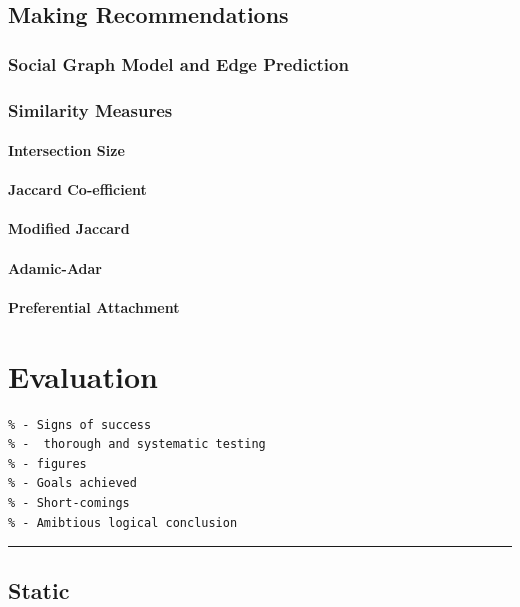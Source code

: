 \documentclass[a4paper,12pt,twoside,notitlepage]{report}
\newcommand{\rulewidth}{300pt}
\newcommand{\halfrule}{
  \begin{center}
    {\rule{\rulewidth}{0.5pt}}
  \end{center}}
\begin{document}
\section{Making Recommendations}

\subsection{Social Graph Model and Edge Prediction}

\subsection{Similarity Measures}

\subsubsection{Intersection Size}

\subsubsection{Jaccard Co-efficient}

\subsubsection{Modified Jaccard}

\subsubsection{Adamic-Adar}

\subsubsection{Preferential Attachment}

\chapter{Evaluation}

\begin{verbatim}
% - Signs of success
% -  thorough and systematic testing
% - figures
% - Goals achieved
% - Short-comings
% - Amibtious logical conclusion 
\end{verbatim}

\halfrule

\section{Static}
\end{document}
